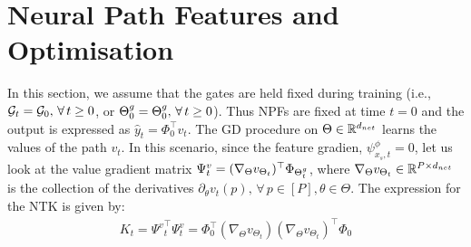 \section{Neural Path Features and Optimisation}

In this section, we assume that the gates are held fixed during training (i.e., $\mathcal{G}_t=\mathcal{G}_0,\,\forall\, t\geq 0$, or ${\Theta}^g_0={\Theta}^g_0,\,\forall\,t\geq 0$). Thus NPFs are fixed at time $t=0$ and the output is expressed as $\hat{y}_t=\Phi^\top_0 v_t$.  The GD procedure on $\Theta\in\mathbb{R}^{d_{net}}$ learns the values of the path $v_t$. In this scenario, since the feature gradien, $\psi^{\phi}_{x_s,t}=0$, let us look at the value gradient matrix $\Psi^v_t=(\nabla_{\Theta}v_{\Theta_t})^\top \Phi_{{\Theta}^g_t}$, where $\nabla_{\Theta}v_{\Theta_t}\in \mathbb{R}^{P\times d_{net}}$ is the collection of the derivatives $\partial_{\theta}v_t(p),\,\forall\,p\in[P],\theta\in\Theta$. The expression for the NTK is given by:
\begin{align}
K_t={\Psi^v}^\top_t\Psi^v_t= \Phi^\top_0(\nabla_{\Theta}v_{\Theta_t})(\nabla_{\Theta}v_{\Theta_t})^\top \Phi_0
\end{align}

